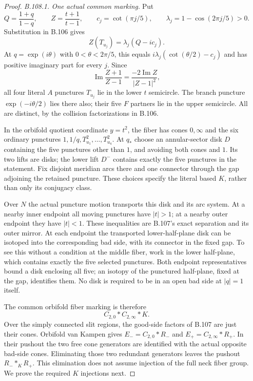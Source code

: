 \begin{proof}
\emph{B.108.1. One actual common marking.}
Put
\[
 Q=\frac{1+q}{1-q},\qquad Z=\frac{t+1}{t-1},\qquad
 c_j=\cot(\pi j/5),\qquad \lambda_j=1-\cos(2\pi j/5)>0.
\]
Substitution in B.106 gives
\[
 Z(T_{u_j})=\lambda_j(Q-i c_j).
\]
At $q=\exp(i\theta)$ with $0<\theta<2\pi/5$, this equals
$i\lambda_j(\cot(\theta/2)-c_j)$ and has positive imaginary
part for every $j$. Since
\[
 \operatorname{Im}\frac{Z+1}{Z-1}
       =\frac{-2\operatorname{Im}Z}{|Z-1|^2},
\]
all four literal $A$ punctures $T_{u_j}$ lie in the lower $t$
semicircle. The branch puncture $\exp(-i\theta/2)$ lies there
also; their five $F$ partners lie in the upper semicircle.
All are distinct, by the collision factorizations in B.106.

In the orbifold quotient coordinate $y=t^2$, the fiber has cones
$0,\infty$ and the six ordinary punctures
$1,1/q,T_{u_1}^2,\ldots,T_{u_4}^2$. At $q_*$ choose an
annular-sector disk $D$ containing the five punctures other than
$1$, and avoiding both cones and $1$. Its two lifts are disks;
the lower lift $D^-$ contains exactly the five punctures in the
statement. Fix disjoint meridian arcs there and one connector
through the gap adjoining the retained puncture. These choices
specify the literal based $K$, rather than only its conjugacy class.

Over $N$ the actual puncture motion transports this disk and its
arc system. At a nearby inner endpoint all moving punctures have
$|t|>1$; at a nearby outer endpoint they have $|t|<1$. These
inequalities are B.107's exact separation and its outer mirror.
At each endpoint the transported lower-half-plane disk can be
isotoped into the corresponding bad side, with its connector in
the fixed gap. To see this without a condition at the middle
fiber, work in the lower half-plane, which contains exactly the
five selected punctures. Both endpoint representatives bound a
disk enclosing all five; an isotopy of the punctured half-plane,
fixed at the gap, identifies them. No disk is required to be in
an open bad side at $|q|=1$ itself.

The common orbifold fiber marking is therefore
\[
 C_{2,0}*C_{2,\infty}*K.
\]
Over the simply connected slit regions, the good-side factors
of B.107 are just their cones. Orbifold van Kampen gives
$E_-=C_{2,0}*R_-$ and $E_+=C_{2,\infty}*R_+$.
In their pushout the two free cone generators are identified
with the actual opposite bad-side cones. Eliminating those two
redundant generators leaves the pushout $R_-*_{K}R_+$.
This elimination does not assume injection of the full neck
fiber group. We prove the required $K$ injections next.


\end{proof}

